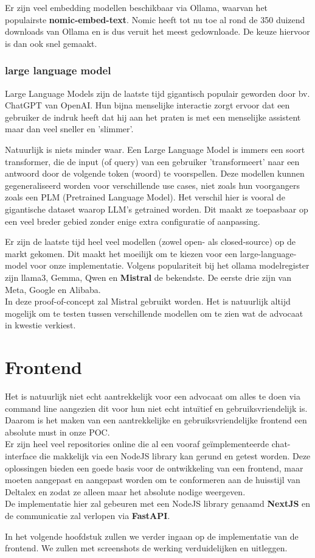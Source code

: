 Er zijn veel embedding modellen beschikbaar via Ollama, waarvan het populairste \textbf{nomic-embed-text}. 
Nomic heeft tot nu toe al rond de 350 duizend downloads van Ollama en is dus veruit het meest gedownloade. 
De keuze hiervoor is dan ook snel gemaakt. 

\subsubsection{large language model}
Large Language Models zijn de laatste tijd gigantisch populair geworden door bv. ChatGPT van OpenAI.
Hun bijna menselijke interactie zorgt ervoor dat een gebruiker de indruk heeft dat hij aan het praten is met een menselijke assistent maar dan veel sneller en 'slimmer'.

Natuurlijk is niets minder waar.
Een Large Language Model is immers een soort transformer, die de input (of query) van een gebruiker 'transformeert' naar een antwoord door de volgende token (woord) te voorspellen.
Deze modellen kunnen gegeneraliseerd worden voor verschillende use cases, niet zoals hun voorgangers zoals een PLM (Pretrained Language Model).
Het verschil hier is vooral de gigantische dataset waarop LLM's getrained worden.
Dit maakt ze toepasbaar op een veel breder gebied zonder enige extra configuratie of aanpassing.

Er zijn de laatste tijd heel veel modellen (zowel open- als closed-source) op de markt gekomen. Dit maakt het moeilijk om te kiezen voor een large-language-model voor onze implementatie. 
Volgens populariteit bij het ollama modelregister zijn llama3, Gemma, Qwen en \textbf{Mistral} de bekendste. De eerste drie zijn van Meta, Google en Alibaba. \\

In deze proof-of-concept zal Mistral gebruikt worden. Het is natuurlijk altijd mogelijk om te testen tussen verschillende modellen om te zien wat de advocaat in kwestie verkiest. 

\section{Frontend}
Het is natuurlijk niet echt aantrekkelijk voor een advocaat om alles te doen via command line aangezien dit voor hun niet echt intuïtief en gebruiksvriendelijk is. 
Daarom is het maken van een aantrekkelijke en gebruiksvriendelijke frontend een absolute must in onze POC. \\ 

Er zijn heel veel repositories online die al een vooraf geïmplementeerde chat-interface die makkelijk via een NodeJS library kan gerund en getest worden. 
Deze oplossingen bieden een goede basis voor de ontwikkeling van een frontend, maar moeten aangepast en aangepast worden om te conformeren aan de huisstijl van Deltalex en zodat ze alleen maar het absolute nodige weergeven. \\

De implementatie hier zal gebeuren met een NodeJS library genaamd \textbf{NextJS} en de communicatie zal verlopen via \textbf{FastAPI}.


In het volgende hoofdstuk zullen we verder ingaan op de implementatie van de frontend. 
We zullen met screenshots de werking verduidelijken en uitleggen. 
